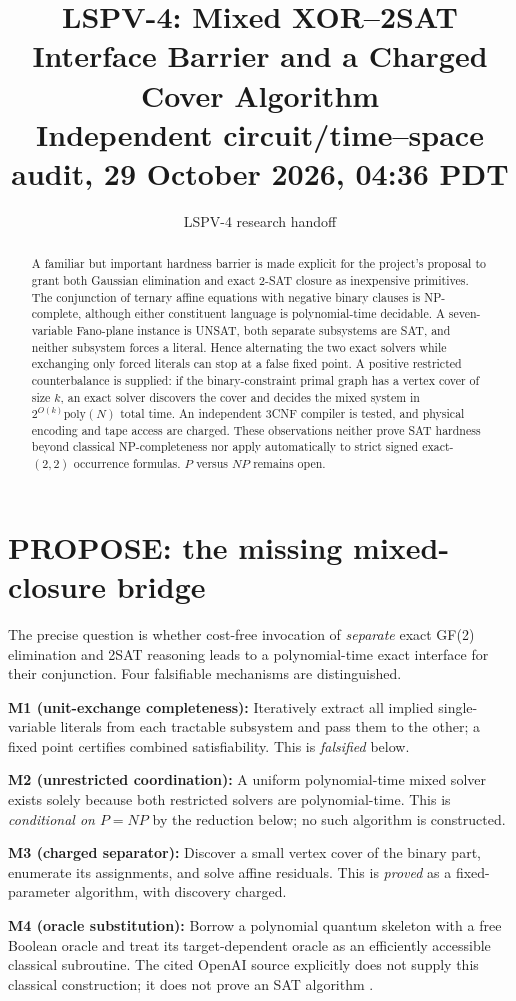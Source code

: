 \documentclass[11pt]{article}
\title{LSPV-4: Mixed XOR--2SAT Interface Barrier and a Charged Cover Algorithm\\\small Independent circuit/time--space audit, 29 October 2026, 04:36 PDT}
\author{LSPV-4 research handoff}
\date{}
\begin{document}
\maketitle
\begin{abstract}
A familiar but important hardness barrier is made explicit for the project's proposal to grant both Gaussian elimination and exact 2-SAT closure as inexpensive primitives. The conjunction of ternary affine equations with negative binary clauses is NP-complete, although either constituent language is polynomial-time decidable. A seven-variable Fano-plane instance is UNSAT, both separate subsystems are SAT, and neither subsystem forces a literal. Hence alternating the two exact solvers while exchanging only forced literals can stop at a false fixed point. A positive restricted counterbalance is supplied: if the binary-constraint primal graph has a vertex cover of size $k$, an exact solver discovers the cover and decides the mixed system in $2^{O(k)}\mathrm{poly}(N)$ total time. An independent 3CNF compiler is tested, and physical encoding and tape access are charged. These observations neither prove SAT hardness beyond classical NP-completeness nor apply automatically to strict signed exact-$(2,2)$ occurrence formulas. $P$ versus $NP$ remains open.
\end{abstract}

\section{PROPOSE: the missing mixed-closure bridge}
The precise question is whether cost-free invocation of \emph{separate} exact GF(2) elimination and 2SAT reasoning leads to a polynomial-time exact interface for their conjunction. Four falsifiable mechanisms are distinguished.
\par\noindent\textbf{M1 (unit-exchange completeness):} Iteratively extract all implied single-variable literals from each tractable subsystem and pass them to the other; a fixed point certifies combined satisfiability. This is \emph{falsified} below.
\par\noindent\textbf{M2 (unrestricted coordination):} A uniform polynomial-time mixed solver exists solely because both restricted solvers are polynomial-time. This is \emph{conditional on $P=NP$} by the reduction below; no such algorithm is constructed.
\par\noindent\textbf{M3 (charged separator):} Discover a small vertex cover of the binary part, enumerate its assignments, and solve affine residuals. This is \emph{proved} as a fixed-parameter algorithm, with discovery charged.
\par\noindent\textbf{M4 (oracle substitution):} Borrow a polynomial quantum skeleton with a free Boolean oracle and treat its target-dependent oracle as an efficiently accessible classical subroutine. The cited OpenAI source explicitly does not supply this classical construction; it does not prove an SAT algorithm \cite{openai2026}.
\end{document}
